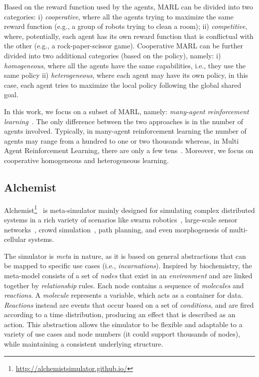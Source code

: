 Based on the reward function used by the agents, MARL can be divided into two categories:
 i) \emph{cooperative}, where all the agents trying to maximize the same reward function (e.g., a group of robots trying to clean a room);
 ii) \emph{competitive}, where, potentially, each agent has its own reward function that is conflictual with the other (e.g., a rock-paper-scissor game).
 Cooperative MARL can be further divided into two additional categories (based on the policy),
 namely:
 i) \emph{homogeneous}, where all the agents have the same capabilities, i.e., they use the same policy
 ii) \emph{heterogeneous}, where each agent may have its own policy, in this case, each agent 
    tries to maximize the local policy following the global shared goal.   

In this work, we focus on a subset of MARL, namely: \emph{many-agent reinforcement learning}~\cite{yang2021many}. 
 The only difference between the two approaches is in the number of agents involved. Typically, in many-agent reinforcement learning the number of agents
 may range from a hundred to one or two thousands whereas, in Multi Agent Reinforcement Learning, there are only a few tens~\cite{smac,marl-curricula}.
 Moreover, we focus on cooperative homogeneous and heterogeneous learning.

\subsection{Alchemist}\label{alchemist}

Alchemist\footnote{\url{http://alchemistsimulator.github.io/}}~\cite{DBLP:journals/jos/PianiniMV13} is meta-simulator
 mainly designed for simulating complex distributed systems 
 in a rich variety of scenarios like swarm robotics~\cite{Casadei2021},
 large-scale sensor networks~\cite{Aguzzi_2022}, crowd simulation~\cite{Beal2015},
 path planning, and even morphogenesis of multi-cellular systems.

The simulator is \emph{meta} in nature, 
 as it is based on general abstractions 
 that can be mapped to specific use cases (i.e., \emph{incarnations}).
% 
Inspired by biochemistry, 
 the meta-model consists of a set of \emph{nodes} 
 that exist in an \emph{environment} and are linked together by \emph{relationship} rules. 
 Each node contains a sequence of \emph{molecules} and \emph{reactions}. 
%
 A \emph{molecule} represents a variable, 
 which acts as a container for data. 
 \emph{Reactions} instead are events that occur based 
 on a set of \emph{conditions}, 
 and are fired according to a time distribution, 
 producing an effect that is described as an action. 
This abstraction allows the simulator to be flexible 
 and adaptable to a variety of use cases and node numbers 
 (it could support thousands of nodes), 
 while maintaining a consistent underlying structure.

